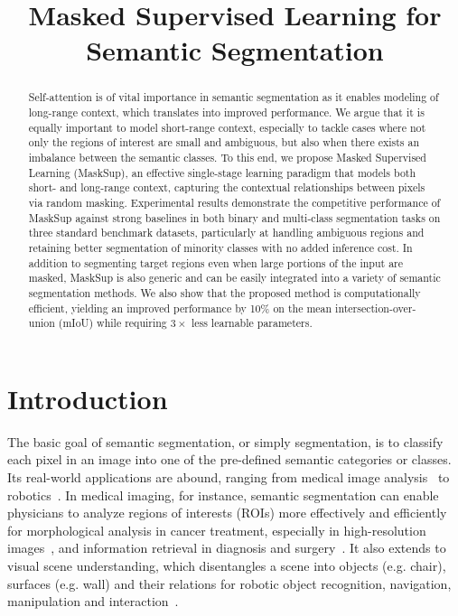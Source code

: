 \documentclass{bmvc2k}
\title{Masked Supervised Learning for Semantic Segmentation}
\begin{document}
\maketitle

\begin{abstract}
Self-attention is of vital importance in semantic segmentation as it enables modeling of long-range context, which translates into improved performance. We argue that it is equally important to model short-range context, especially to tackle cases where not only the regions of interest are small and ambiguous, but also when there exists an imbalance between the semantic classes. To this end, we propose Masked Supervised Learning (MaskSup), an effective single-stage learning paradigm that models both short- and long-range context, capturing the contextual relationships between pixels via random masking. Experimental results demonstrate the competitive performance of MaskSup against strong baselines in both binary and multi-class segmentation tasks on three standard benchmark datasets, particularly at handling ambiguous regions and retaining better segmentation of minority classes with no added inference cost. In addition to segmenting target regions even when large portions of the input are masked, MaskSup is also generic and can be easily integrated into a variety of semantic segmentation methods. We also show that the proposed method is computationally efficient, yielding an improved performance by 10\% on the mean intersection-over-union (mIoU) while requiring $3\times$ less learnable parameters.
\end{abstract}




\section{Introduction}
The basic goal of semantic segmentation, or simply segmentation, is to classify each pixel in an image into one of the pre-defined semantic categories or classes. Its real-world applications are abound, ranging from medical image analysis~\cite{sirinukunwattana2017gland} to robotics~\cite{lai2011large}. In medical imaging, for instance, semantic segmentation can enable physicians to analyze regions of interests (ROIs) more effectively and efficiently for morphological analysis in cancer treatment, especially in high-resolution images~\cite{sirinukunwattana2017gland}, and information retrieval in diagnosis and surgery~\cite{jha2020kvasir}. It also extends to visual scene understanding, which disentangles a scene into objects (e.g. chair), surfaces (e.g. wall) and their relations for robotic object recognition, navigation, manipulation and interaction~\cite{lai2011large}.
\end{document}
